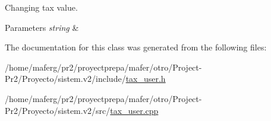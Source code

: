 Changing tax value. 


\begin{DoxyParams}{Parameters}
{\em string} & \\
\hline
\end{DoxyParams}


The documentation for this class was generated from the following files\+:\begin{DoxyCompactItemize}
\item 
/home/maferg/pr2/proyectprepa/mafer/otro/\+Project-\/\+Pr2/\+Proyecto/sistem.\+v2/include/\hyperlink{tax__user_8h}{tax\+\_\+user.\+h}\item 
/home/maferg/pr2/proyectprepa/mafer/otro/\+Project-\/\+Pr2/\+Proyecto/sistem.\+v2/src/\hyperlink{tax__user_8cpp}{tax\+\_\+user.\+cpp}\end{DoxyCompactItemize}
